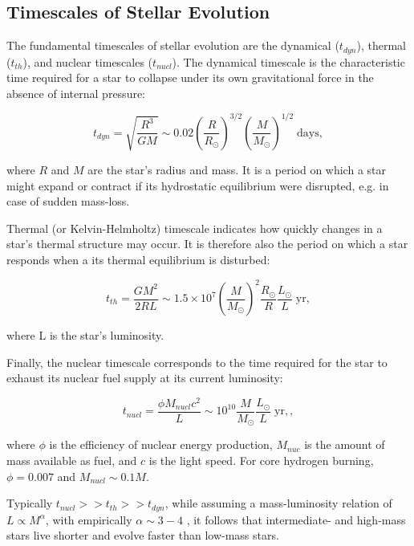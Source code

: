\subsection{Timescales of Stellar Evolution}\label{subsec:timescales}

The fundamental timescales of stellar evolution are the dynamical ($t_{dyn}$), thermal ($t_{th}$), and nuclear timescales ($t_{nucl}$). The dynamical timescale is the characteristic time required for a star to collapse under its own gravitational force in the absence of internal pressure:

\begin{equation}
    t_{dyn} = \sqrt{\frac{R^3}{GM}} \sim 0.02 \left( \frac{R}{R_{\odot}} \right)^{3/2} \left( \frac{M}{M_{\odot}}\right)^{1/2} \; \text{days},
\end{equation}\label{dynamical_timsecale}

where $R$ and $M$ are the star's radius and mass. It is a period on which a star might expand or contract if its hydrostatic equilibrium were disrupted, e.g. in case of sudden mass-loss.

Thermal (or Kelvin-Helmholtz) timescale indicates how quickly changes in a star's thermal structure may occur. It is therefore also the period on which a star responds when a its thermal equilibrium is disturbed:

\begin{equation}
    t_{th} = \frac{G M^2}{2RL} \sim 1.5 \times 10^7 \left( \frac{M}{M_{\odot}} \right)^{2} \frac{R_{\odot}}{R} \frac{L_{\odot}}{L} \; \text{yr},
\end{equation}\label{thermal_timsecale}

where L is the star's luminosity.

Finally, the nuclear timescale corresponds to the time required for the star to exhaust its nuclear fuel supply at its current luminosity: 

\begin{equation}
    t_{nucl} = \frac{\phi M_{nucl} c^2}{L} \sim 10^{10} \frac{M}{M_{\odot}} \frac{L_{\odot}}{L} \; \text{yr},,
\end{equation}\label{nuclear_timsecale}

where $\phi$ is the efficiency of nuclear energy production, $M_{nuc}$ is the amount of mass available as fuel, and $c$ is the light speed. For core hydrogen burning, $\phi = 0.007$ and $M_{nucl} \sim 0.1 M$.

Typically $t_{nucl} >> t_{th} >> t_{dyn}$, while assuming a mass-luminosity relation of $L \propto M^{\alpha}$, with empirically $\alpha \sim 3-4$ \citep{eker2015main}, it follows that intermediate- and high-mass stars live shorter and evolve faster than low-mass stars.

